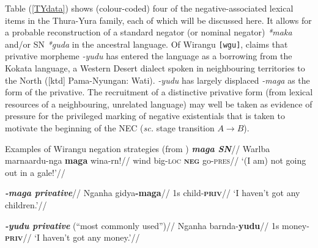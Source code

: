 \documentclass[usenames,dvipsnames,11pt]{article}
\begin{document}
{%
%		

Table (\ref{TYdata}) shows (colour-coded) four of the negative-associated lexical items in the Thura-Yura family, each of which will be discussed here. It allows for a probable reconstruction of a standard negator (or nominal negator) \textit{*maka} and/or SN \textit{*guda} in the ancestral language. Of Wirangu \texttt{[wgu]}, \citet[57]{Hercus1999} claims that privative morpheme \textit{-yudu} has entered the language as a borrowing from the Kokata language, a Western Desert dialect spoken in neighbouring territories to the North ([\gls{ktd}] Pama-Nyungan: Wati). \textit{-yudu} has largely displaced \textit{-maga} as the form of the privative. The recruitment of a distinctive privative form (from lexical resources of a neighbouring, unrelated language) may well be taken as evidence of pressure for the privileged marking of negative existentials that is taken to motivate the beginning of the NEC (\textit{sc.} stage transition $A\to B$).



\pex Examples of Wirangu negation strategies (from \citealt{Hercus1999})\label{wgu-exx}
\a\begingl\glpreamble \textbf{\em{maga} SN}//
\gla Warlba marnaardu-nga \textbf{maga} wina-rn!//
\glb wind big\textsc{-loc} \textsc{\textbf{neg}} go\textsc{-pres}//
\glft `(I am) not going out in a gale!'//\endgl

\a\begingl\glpreamble \textbf{\em{-maga} privative}//
\gla Nganha gidya\textbf{-maga}//
\glb 1s child-\textsc{\textbf{priv}}//
\glft`I haven't got any children.'//\endgl

\a\begingl
\glpreamble\textbf{ \em{-yudu} privative }(``most commonly used'')//
\gla Nganha barnda-\textbf{yudu}//
\glb 1s money-\textsc{\textbf{priv}}//
\glft`I haven't got any money.'//\endgl

}
\end{document}
